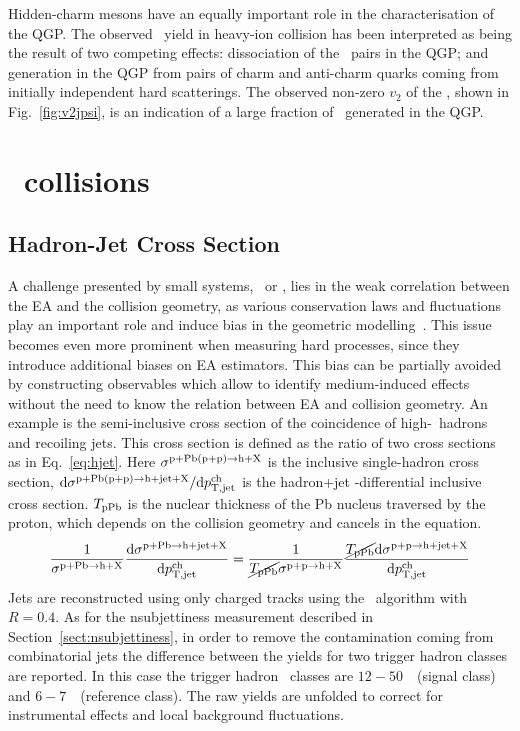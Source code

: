 \documentclass[10pt]{article}
\begin{document}
Hidden-charm mesons have an equally important role in the characterisation of the QGP.
The observed \jpsi\ yield in heavy-ion collision has been interpreted as being the result of two competing effects: dissociation of the \ccbar\ pairs in the QGP; and generation in the QGP from pairs of charm and anti-charm quarks coming from initially independent hard scatterings.
The observed non-zero $v_2$ of the \jpsi, shown in Fig.~\ref{fig:v2jpsi}, is an indication of a large fraction of \jpsi\ generated in the QGP.

\section{\pPb\ collisions}

\subsection{Hadron-Jet Cross Section} 
A challenge presented by small systems, \pp\ or \pPb, lies in the weak correlation between the EA and the collision geometry,
as various conservation laws and fluctuations play an important role and induce bias in the geometric modelling~\cite{}. 
This issue becomes even more prominent when measuring hard processes, since they introduce additional biases on EA estimators.
This bias can be partially avoided by constructing observables which allow to identify medium-induced effects without the need to know the relation between EA and collision geometry. 
An example is the semi-inclusive cross section of the coincidence of high-\pt\ hadrons and recoiling jets.
This cross section is defined as the ratio of two cross sections as in Eq.~\ref{eq:hjet}. Here $\sigma^{{\rm p+Pb (p+p)}\rightarrow{\rm h+X}}$ is the inclusive single-hadron cross
section, $\mathrm{d}\sigma^{{\rm p+Pb (p+p)}\rightarrow{\rm h+jet+X}}/ \mathrm{d}p_{\rm T,jet}^{\rm ch}$ is the hadron+jet \pt-differential inclusive cross section.
$T_{\rm pPb}$ is the nuclear thickness of the Pb nucleus traversed by the proton, which depends on the collision geometry and cancels in the equation.
\begin{equation}
\frac{1}{\sigma^{{\rm p+Pb}\rightarrow{\rm h+X}}} \frac{\mathrm{d}\sigma^{{\rm p+Pb}\rightarrow{\rm h+jet+X}}}{\mathrm{d}p_{\rm T,jet}^{\rm ch}} = 
\frac{1}{\cancel{T_{\rm pPb}}\sigma^{{\rm p+p}\rightarrow{\rm h+X}}} \frac{\cancel{T_{\rm pPb}}\mathrm{d}\sigma^{{\rm p+p}\rightarrow{\rm h+jet+X}}}{\mathrm{d}p_{\rm T,jet}^{\rm ch}}
\label{eq:hjet}
\end{equation}
Jets are reconstructed using only charged tracks using the \antikt\ algorithm with $R=0.4$.
As for the nsubjettiness measurement described in Section~\ref{sect:nsubjettiness}, in order to remove the contamination coming from combinatorial jets the difference between the yields
for two trigger hadron classes are reported. In this case the trigger hadron \pt\ classes are $12-50$~\GeVc\ (signal class) and $6-7$~\GeVc\ (reference class).
The raw yields are unfolded to correct for instrumental effects and local background fluctuations.
\end{document}
